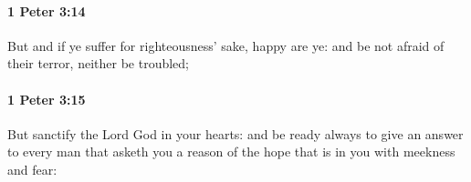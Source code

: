 		\paragraph{1 Peter 3:14} %
			\label{1PETER-3-14}

			But and if ye suffer for righteousness' sake, happy are ye: and be not afraid of their terror, neither be troubled;

			\begin{framed}
			\scriptsize
				\begin{compactdesc}
					\item[SBLG] 
				\end{compactdesc}
			\end{framed}

		\paragraph{1 Peter 3:15} %
			\label{1PETER-3-15}

			But sanctify the Lord God in your hearts: and be ready always to give an answer to every man that asketh you a reason of the hope that is in you with meekness and fear:

